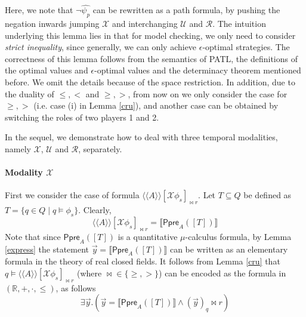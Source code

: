 \documentclass[times, 10 pt,twocolumn]{article}
\newenvironment{proof}[1][Proof]{\noindent\rm\textit{#1: }}{{\hspace*{\fill}$\square$}\ \newline}
\newtheorem{theorem}{Theorem}{\bfseries}{\rm}
\newcommand{\mb}[1]{\mathbb{#1}}
\newcommand{\mc}[1]{\mathcal{#1}}
\newcommand{\lla}{\langle\langle}
\newcommand{\rra}{\rangle\rangle}
\newcommand{\lb}{\llbracket}
\newcommand{\rb}{\rrbracket}
\newcommand{\Ppre}{\textsf{Ppre}}
\begin{document}
Here, we note that  $\neg\widehat{\psi_p}$ can be rewritten as a
path formula, by pushing the negation inwards jumping $\mc{X}$ and
interchanging $\mc{U}$ and $\mc{R}$. The intuition underlying this
lemma lies in that for model checking, we only need to consider
\emph{strict inequality}, since generally, we can only achieve
$\epsilon$-optimal strategies. The correctness of this lemma
follows from the semantics of PATL, the definitions of the optimal
values and $\epsilon$-optimal values and the determinacy theorem
mentioned before. We omit the details because of the space
restriction.
%
%
In addition, due to the duality of $\leq, <$ and $\geq, >$, from
now on we only consider the case for $\geq, >$ (i.e. case (i) in
Lemma \ref{cru}), and another case can be obtained by switching
the roles of two players 1 and 2.
%
%
%
%

In the sequel, we demonstrate how to deal with three temporal
modalities, namely $\mc{X}$, $\mc{U}$ and $\mc{R}$, separately.

\paragraph{Modality $\mc{X}$} First we consider the case
of formula $\lla A\rra [\mc{X}\phi_s]_{\bowtie r}$. Let
$T\subseteq Q$ be defined as $T= \{q\in Q\mid q\models \phi_s \}$.
Clearly,
\begin{equation}  \label{eqn11}
\lla A\rra[\mc{X}\phi_s]_{\bowtie r}= \lb \Ppre_A([T])\rb
\end{equation}
Note that since $\Ppre_A([T])$ is a quantitative $\mu$-calculus
formula, by Lemma \ref{express} the statement $\vec{y}=\lb
\Ppre_A([T]) \rb$ can be written as an elementary formula in the
theory of real closed fields. It follows from Lemma \ref{cru} that
$q\models \lla A\rra[\mc{X}\phi_s]_{\bowtie r}$ (where $\bowtie
\in\{\geq, >\}$) can be encoded as the formula in $(\mb{R}, +,
\cdot, \leq)$, as follows
\[\exists \vec{y}. (\vec{y}=\lb\Ppre_A([T])\rb \wedge (\vec{y})_q \bowtie
r)\]
\end{document}
